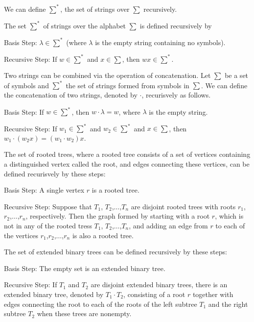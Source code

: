 \documentclass[../discrete.tex]{subfiles}
\begin{document}
We can define $\sum^*$, the set of strings over $\sum$ recursively.
\begin{definition}
    The set $\sum^*$ of strings over the alphabet $\sum$ is defined recursively by 

    Basis Step: $\lambda \in \sum^*$ (where $\lambda$ is the empty string containing no symbols).

    Recursive Step: If $w \in \sum^*$ and $x\in \sum$, then $wx\in \sum^*$.
\end{definition}

\begin{definition}
    Two strings can be combined via the operation of concatenation. Let $\sum$ be a set of 
    symbols and $\sum^*$ the set of strings formed from symbols in $\sum$. We can define the 
    concatenation of two strings, denoted by $\cdot$, recurisvely as follows.

    Basis Step: If $w\in \sum^*$, then $w\cdot \lambda = w$, where $\lambda$ is the empty string.

    Recursive Step: If $w_1 \in \sum^*$ and $w_2 \in \sum^*$ and $x\in \sum$, then $w_1\cdot(w_2x)=(w_1\cdot w_2)x$.
\end{definition}

\begin{definition}
    The set of rooted trees, where a rooted tree consists of a set of vertices containing a distinguished
    vertex called the root, and edges connecting these vertices, can be defined recurisvely by these steps:

    Basis Step: A single vertex $r$ is a rooted tree.

    Recursive Step: Suppose that $T_1$, $T_2$,$\dots$,$T_n$ are disjoint rooted trees with roots $r_1$, $r_2$,$\dots$,$r_n$, respectively.
    Then the graph formed by starting with a root $r$, which is not in any of the rooted tress $T_1$, $T_2$,$\dots$,$T_n$, and adding an edge from 
    $r$ to each of the vertices $r_1$,$r_2$,$\dots$,$r_n$ is also a rooted tree.
\end{definition}

\begin{definition}
    The set of extended binary trees can be defined recursively by these steps:

    Basis Step: The empty set is an extended binary tree.

    Recursive Step: If $T_1$ and $T_2$ are disjoint extended binary trees, there is an extended binary tree, denoted by $T_1\cdot T_2$, consisting 
    of a root $r$ together with edges connecting the root to each of the roots of the left subtree $T_1$ and the right subtree 
    $T_2$ when these trees are nonempty.
\end{definition}
\end{document}
